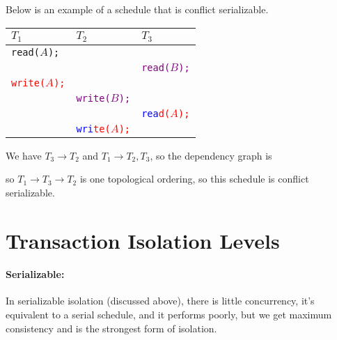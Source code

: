 \documentclass{report}
\newenvironment{example}{\begin{tcolorbox}[title={Example},colback=green!5!white,colframe=black!75!green]}{\end{tcolorbox}}
\renewcommand{\tt}[1]{\texttt{{#1}}}
\begin{document}
\begin{example}
    Below is an example of a schedule that is conflict serializable.

    {
        \centering
        \begin{tabular}{l|l|l}
            $T_1$ & $T_2$ & $T_3$ \\
            \hline
            \tt{read($A$);} & & \\
                            & & \tt{\textcolor{purple}{read($B$);}} \\
            \tt{\textcolor{red}{write($A$);}} & & \\
                                              & \tt{\textcolor{purple}{write($B$);}} & \\
                                              & &
                                              \tt{\textcolor{blue}{rea}\textcolor{red}{d($A$);}} \\
                                              & \tt{\textcolor{blue}{wri}\textcolor{red}{te($A$);}} & \\
        \end{tabular}
        \par
    }

    We have $T_3 \to T_2$ and $T_1 \to T_2, T_3$, so the dependency graph is

    {
        \centering
        \par
    }

    so $T_1 \to T_3 \to T_2$ is one topological ordering, so this schedule is
    conflict serializable.
\end{example}

\section{Transaction Isolation Levels}
\paragraph{Serializable:} In serializable isolation (discussed above), there is
little concurrency, it's equivalent to a serial schedule, and it performs
poorly, but we get maximum consistency and is the strongest form of isolation.
\end{document}
